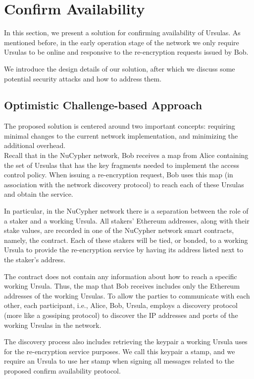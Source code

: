 \section{Confirm Availability}
In this section, we present a solution for confirming availability of 
Ursulas. As mentioned before, in the early operation stage of the network we only 
require Ursulas to be online and responsive to the re-encryption 
requests issued by Bob. 


We introduce the design details of our solution, after which we discuss some potential security attacks and how to address them.


\subsection{Optimistic Challenge-based Approach}
The proposed solution is centered around two important concepts: requiring minimal 
changes to the current network implementation, and minimizing the additional overhead. \\


 Recall that in the NuCypher network, Bob receives a map from Alice containing 
the set of Ursulas that has the key fragments needed to implement the access control policy. 
When issuing a re-encryption request, Bob uses this map (in association with the network discovery protocol) to reach each of these Ursulas and obtain 
the service. 


In particular, in the NuCypher network there is a separation between the role of a staker and a working Ursula. All stakers' Ethereum addresses, along with their stake values, are recorded in one of the NuCypher network smart contracts, namely, the \stakeescrow contract. Each of these stakers will be tied, or bonded, to a working Ursula to provide the re-encryption service by having its address listed next to the staker's address. 


The \stakeescrow contract does not contain any information about how to reach a specific working Ursula. Thus, the map that Bob receives includes only the Ethereum addresses of the working Ursulas. To allow the parties to communicate with each other, each participant, i.e., Alice, Bob, Ursula, employs a discovery protocol (more like a gossiping protocol) to discover the IP addresses and ports of the working Ursulas in the network.  


The discovery process also includes retrieving the keypair a working Ursula uses for the re-encryption service purposes. We call this keypair a stamp, and we require an Ursula to use her stamp when signing all messages related to the proposed confirm availability protocol. \\


